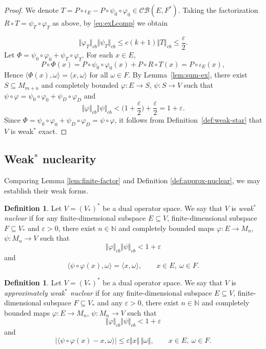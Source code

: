 \documentclass[12pt]{article}
\theoremstyle{definition}
\newtheorem{definition}[theorem]{Definition}
\theoremstyle{remark}
\begin{document}
\begin{proof}
We denote $T=P\circ\iota_E-P\circ\psi_0\circ\varphi_0\in\mathcal{CB}(E,F^*)$. Taking the factorization $R\circ T=\psi_T\circ\varphi_T$ as above, by \eqref{eq:exLcomp} we obtain

\[
\Vert\varphi_T\Vert_{cb}\Vert\psi_T\Vert_{cb}\le c(k+1)\Vert T\Vert_{cb}\le\frac{\varepsilon}{2}.
\]
Let $\Phi=\psi_0\circ\varphi_0+\psi_T\circ\varphi_T$. For each $x\in E$,
\[
P\circ\Phi(x)=P\circ\psi_0\circ\varphi_0(x)+P\circ R\circ T(x)=P\circ\iota_E(x),
\]
Hence $\langle\Phi(x),\omega\rangle=\langle x,\omega\rangle$ for all $\omega\in F$.
By Lemma~\ref{lem:sum-ex}, there exist $S\subseteq M_{m+n}$ and
completely bounded $\varphi:E\to S$, $\psi:S\to V$ such that
$\psi\circ\varphi=\psi_0\circ\varphi_0+\psi_D\circ\varphi_D$ and
\[
\Vert\varphi\Vert_{cb}\Vert\psi\Vert_{cb}
<\Big(1+\frac{\varepsilon}{2}\Big)+\frac{\varepsilon}{2}=1+\varepsilon.
\]
Since $\Phi=\psi_0\circ\varphi_0+\psi_D\circ\varphi_D=\psi\circ\varphi$, it follows from 
Definition~\ref{def:weak-star} that $V$ is weak$^{*}$ exact.
\end{proof}





\subsection{Weak$^{*}$ nuclearity}

Comparing Lemma \ref{lem:finite-factor} and Definition \ref{def:approx-nuclear}, we may establish their weak forms.



\begin{definition}\label{def:weak-star-nuclear}
Let $V=(V_*)^*$ be a dual operator space. We say that $V$ is
\emph{weak$^{*}$ nuclear} if for any finite-dimensional subspace
$E\subseteq V$, finite-dimensional subspace $F\subseteq V_*$
and $\varepsilon>0$, there exist $n\in\mathbb N$ and completely
bounded maps $\varphi:E\to M_n$, $\psi:M_n\to V$ such that
\[
\Vert\varphi\Vert_{cb}\Vert\psi\Vert_{cb}<1+\varepsilon
\]
and
\[
\langle\psi\circ\varphi(x),\omega\rangle
=\langle x,\omega\rangle,\qquad x\in E,\ \omega\in F.
\]
\end{definition}

\begin{definition}\label{def:approx-weak-star-nuclear}
Let $V=(V_*)^*$ be a dual operator space. We say that $V$ is
\emph{approximately weak$^{*}$ nuclear} if for any finite-dimensional
subspace $E\subseteq V$, finite-dimensional subspace
$F\subseteq V_*$ and any $\varepsilon>0$, there exist
$n\in\mathbb N$ and completely bounded maps $\varphi:E\to M_n$,
$\psi:M_n\to V$ such that
\[
\Vert\varphi\Vert_{cb}\Vert\psi\Vert_{cb}<1+\varepsilon
\]
and
\[
|\langle\psi\circ\varphi(x)-x,\omega\rangle|
\le\varepsilon\Vert x\Vert\,\Vert\omega\Vert,
\qquad x\in E,\ \omega\in F.
\]
\end{definition}
\end{document}
